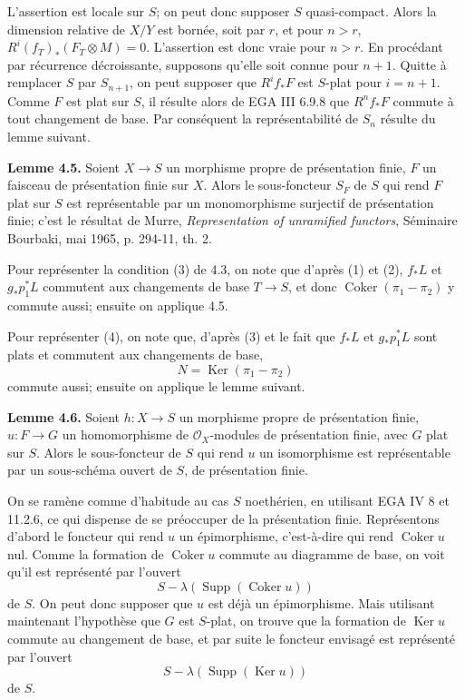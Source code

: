 \documentclass[11pt]{article}
\providecommand{\Coker}{\operatorname{Coker}}
\providecommand{\Ker}{\operatorname{Ker}}
\providecommand{\Supp}{\operatorname{Supp}}
\begin{document}
L'assertion est locale sur \(S\); on peut donc supposer \(S\) quasi-compact. Alors la dimension relative de \(X/Y\) est bornée, soit par \(r\), et pour \(n>r\), \(R^i(f_T)_*(F_T\otimes M)=0\). L'assertion est donc vraie pour \(n>r\). En procédant par récurrence décroissante, supposons qu'elle soit connue pour \(n+1\). Quitte à remplacer \(S\) par \(S_{n+1}\), on peut supposer que \(R^if_*F\) est \(S\)-plat pour \(i=n+1\). Comme \(F\) est plat sur \(S\), il résulte alors de EGA III 6.9.8 que \(R^nf_*F\) commute à tout changement de base. Par conséquent la représentabilité de \(S_n\) résulte du lemme suivant.

\textbf{Lemme 4.5.} Soient \(X\to S\) un morphisme propre de présentation finie, \(F\) un faisceau de présentation finie sur \(X\). Alors le sous-foncteur \(S_F\) de \(S\) qui rend \(F\) plat sur \(S\) est représentable par un monomorphisme surjectif de présentation finie; c'est le résultat de Murre, \emph{Representation of unramified functors}, Séminaire Bourbaki, mai 1965, p. 294-11, th. 2.

Pour représenter la condition (3) de 4.3, on note que d'après (1) et (2), \(f_*L\) et \(g_*p_1^*L\) commutent aux changements de base \(T\to S\), et donc \(\Coker(\pi_1-\pi_2)\) y commute aussi; ensuite on applique 4.5.

Pour représenter (4), on note que, d'après (3) et le fait que \(f_*L\) et \(g_*p_1^*L\) sont plats et commutent aux changements de base,
\[
  N=\Ker(\pi_1-\pi_2)
\]
commute aussi; ensuite on applique le lemme suivant.

\textbf{Lemme 4.6.} Soient \(h:X\to S\) un morphisme propre de présentation finie, \(u:F\to G\) un homomorphisme de \(\mathcal O_X\)-modules de présentation finie, avec \(G\) plat sur \(S\). Alors le sous-foncteur de \(S\) qui rend \(u\) un isomorphisme est représentable par un sous-schéma ouvert de \(S\), de présentation finie.

On se ramène comme d'habitude au cas \(S\) noethérien, en utilisant EGA IV 8 et 11.2.6, ce qui dispense de se préoccuper de la présentation finie. Représentons d'abord le foncteur qui rend \(u\) un épimorphisme, c'est-à-dire qui rend \(\Coker u\) nul. Comme la formation de \(\Coker u\) commute au diagramme de base, on voit qu'il est représenté par l'ouvert
\[
  S-\lambda(\Supp(\Coker u))
\]
de \(S\). On peut donc supposer que \(u\) est déjà un épimorphisme. Mais utilisant maintenant l'hypothèse que \(G\) est \(S\)-plat, on trouve que la formation de \(\Ker u\) commute au changement de base, et par suite le foncteur envisagé est représenté par l'ouvert
\[
  S-\lambda(\Supp(\Ker u))
\]
de \(S\).
\end{document}
